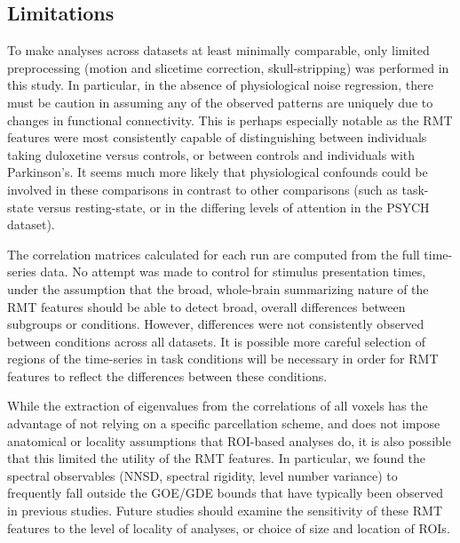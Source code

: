 \documentclass[10pt]{article}
\begin{document}
\subsection{Limitations}

To make analyses across datasets at least minimally comparable, only limited preprocessing (motion
and slicetime correction, skull-stripping) was performed in this study. In particular, in the
absence of physiological noise regression, there must be caution in assuming any of the observed
patterns are uniquely due to changes in functional connectivity. This is perhaps especially notable
as the RMT features were most consistently capable of distinguishing between individuals taking
duloxetine versus controls, or between controls and individuals with Parkinson's. It seems much more
likely that physiological confounds could be involved in these comparisons in contrast to other
comparisons (such as task-state versus resting-state, or in the differing levels of attention in the
PSYCH dataset).

The correlation matrices calculated for each run are computed from the full time-series data. No
attempt was made to control for stimulus presentation times, under the assumption that the broad,
whole-brain summarizing nature of the RMT features should be able to detect broad, overall
differences between subgroups or conditions. However, differences were not consistently observed
between conditions across all datasets. It is possible more careful selection of regions of the
time-series in task conditions will be necessary in order for RMT features to reflect the
differences between these conditions.

While the extraction of eigenvalues from the correlations of all voxels has the advantage of not
relying on a specific parcellation scheme, and does not impose anatomical or locality assumptions
that ROI-based analyses do, it is also possible that this limited the utility of the RMT features.
In particular, we found the spectral observables (NNSD, spectral rigidity, level number variance) to
frequently fall outside the GOE/GDE bounds that have typically been observed in previous studies.
Future studies should examine the sensitivity of these RMT features to the level of locality of
analyses, or choice of size and location of ROIs.

\end{document}
